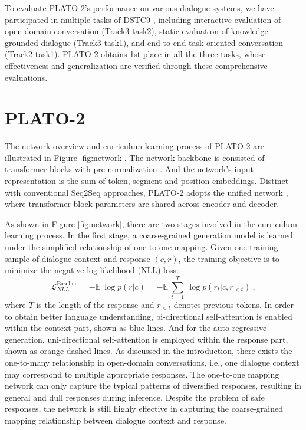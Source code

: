 \documentclass[letterpaper]{article} \usepackage{aaai21}  \usepackage{times}  \usepackage{helvet} \usepackage{courier}  \usepackage[hyphens]{url}  \usepackage{graphicx} \urlstyle{rm} \def\UrlFont{\rm}  \usepackage{natbib}  \usepackage{caption} \frenchspacing  \setlength{\pdfpagewidth}{8.5in}  \setlength{\pdfpageheight}{11in}  \usepackage{amsmath}
\begin{document}
To evaluate PLATO-2's performance on various dialogue systems, we have participated in multiple tasks of DSTC9 \cite{gunasekara2020overview}, including interactive evaluation of open-domain conversation (Track3-task2), static evaluation of knowledge grounded dialogue (Track3-task1), and end-to-end task-oriented conversation (Track2-task1). PLATO-2 obtains 1st place in all the three tasks, whose effectiveness and generalization are verified through these comprehensive evaluations. 

\section{PLATO-2}
The network overview and curriculum learning process of PLATO-2 are illustrated in Figure \ref{fig:network}. The network backbone is consisted of transformer blocks with pre-normalization \cite{vaswani2017attention, radford2019language}. And the network's input representation is the sum of token, segment and position embeddings. Distinct with conventional Seq2Seq approaches, PLATO-2 adopts the unified network \cite{dong2019unified, bao2019plato}, where transformer block parameters are shared across encoder and decoder. 

As shown in Figure \ref{fig:network}, there are two stages involved in the curriculum learning process. In the first stage, a coarse-grained generation model is learned under the simplified relationship of one-to-one mapping. Given one training sample of dialogue context and response $(c, r)$, the training objective is to minimize the negative log-likelihood (NLL) loss:
\begin{equation}\nonumber
\mathcal{L}_{NLL}^{\text{Baseline}}=-\mathbb{E}~\log p(r|c)
=-\mathbb{E}~ \sum_{t=1}^T~\log p(r_t|c,r_{<t})~,
\end{equation}
where $T$ is the length of the response and $r_{<t}$ denotes previous tokens. In order to obtain better language understanding, bi-directional self-attention is enabled within the context part, shown as blue lines. And for the auto-regressive generation, uni-directional self-attention is employed within the response part, shown as orange dashed lines. As discussed in the introduction, there exists the one-to-many relationship in open-domain conversations, i.e., one dialogue context may correspond to multiple appropriate responses. The one-to-one mapping network can only capture the typical patterns of diversified responses, resulting in general and dull responses during inference. Despite the problem of safe responses, the network is still highly effective in capturing the coarse-grained mapping relationship between dialogue context and response. 
\end{document}
